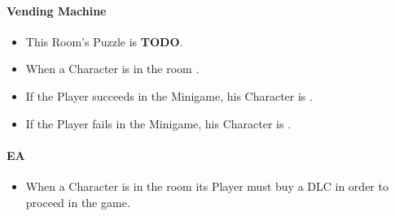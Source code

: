 \paragraph{Vending Machine} 
\begin{itemize}
	\item This Room's Puzzle is \textbf{TODO}.
	\item When a Character is in the room .
	\item If the Player succeeds in the Minigame, his Character is \textbf{}.
	\item If the Player fails    in the Minigame, his Character is \textbf{}.
\end{itemize}

\paragraph{EA} 
\begin{itemize}
	\item When a Character is in the room its Player must buy a DLC in order to proceed in the game.
\end{itemize}

